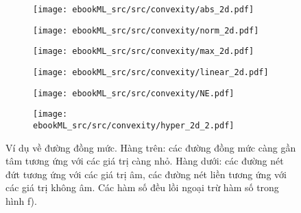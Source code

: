 \begin{figure}[t]
\begin{subfigure}{0.325\textwidth}
\texttt{[image: ebookML\_src/src/convexity/abs\_2d.pdf]}
\caption{}
\end{subfigure}
\begin{subfigure}{0.325\textwidth}
\texttt{[image: ebookML\_src/src/convexity/norm\_2d.pdf]}
\caption{}
\end{subfigure}
\begin{subfigure}{0.325\textwidth}
\texttt{[image: ebookML\_src/src/convexity/max\_2d.pdf]}
\caption{}
\end{subfigure}

\begin{subfigure}{0.325\textwidth}
\texttt{[image: ebookML\_src/src/convexity/linear\_2d.pdf]}
\caption{}
\label{fig:16_contoursd}
\end{subfigure}
\begin{subfigure}{0.325\textwidth}
\texttt{[image: ebookML\_src/src/convexity/NE.pdf]}
\caption{}
\label{fig:16_contourse}
\end{subfigure}
\begin{subfigure}{0.325\textwidth}
\texttt{[image: ebookML\_src/src/convexity/hyper\_2d\_2.pdf]}
\caption{}
\label{fig:16_contoursf}
\end{subfigure}
\caption{Ví dụ về đường đồng mức. Hàng trên: các đường đồng mức càng gần tâm tương ứng với các giá trị càng nhỏ. Hàng dưới: các đường nét đứt tương ứng với các giá trị âm, các đường nét liền tương ứng với các giá trị không âm. Các hàm số đều lồi ngoại trừ hàm số trong hình f).}
\label{fig:16_contours}
\end{figure}

